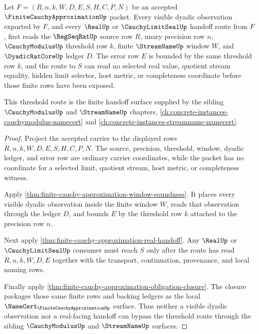 \begin{theorem}
\label{thm:finite-cauchy-approximation-threshold-route-coverage}
Let $F=(R,n,k,W,D,E,S,H,C,P,N)$ be an accepted $\FiniteCauchyApproximationUp$ packet. Every visible dyadic observation exported by $F$, and every $\RealUp$ or $\CauchyLimitSealUp$ handoff route from $F$, first reads the $\RegSeqRatUp$ source row $R$, unary precision row $n$, $\CauchyModulusUp$ threshold row $k$, finite $\StreamNameUp$ window $W$, and $\DyadicRatCoreUp$ ledger $D$. The error row $E$ is bounded by the same threshold row $k$, and the route to $S$ can read no selected real value, quotient stream equality, hidden limit selector, host metric, or completeness coordinate before those finite rows have been exposed.

This threshold route is the finite handoff surface supplied by the sibling $\CauchyModulusUp$ and $\StreamNameUp$ chapters, \autoref{ch:concrete-instances-cauchymodulus-namecert} and \autoref{ch:concrete-instances-streamname-namecert}.
\end{theorem}
\begin{proof}
Project the accepted carrier to the displayed rows $R,n,k,W,D,E,S,H,C,P,N$. The source, precision, threshold, window, dyadic ledger, and error row are ordinary carrier coordinates, while the packet has no coordinate for a selected limit, quotient stream, host metric, or completeness witness.

Apply \autoref{thm:finite-cauchy-approximation-window-soundness}. It places every visible dyadic observation inside the finite window $W$, reads that observation through the ledger $D$, and bounds $E$ by the threshold row $k$ attached to the precision row $n$.

Next apply \autoref{thm:finite-cauchy-approximation-real-handoff}. Any $\RealUp$ or $\CauchyLimitSealUp$ consumer must reach $S$ only after the route has read $R,n,k,W,D,E$ together with the transport, continuation, provenance, and local naming rows.

Finally apply \autoref{thm:finite-cauchy-approximation-obligation-closure}. The closure packages those same finite rows and backing ledgers as the local $\NameCert_{\FiniteCauchyApproximationUp}$ surface. Thus neither a visible dyadic observation nor a real-facing handoff can bypass the threshold route through the sibling $\CauchyModulusUp$ and $\StreamNameUp$ surfaces.
\end{proof}

